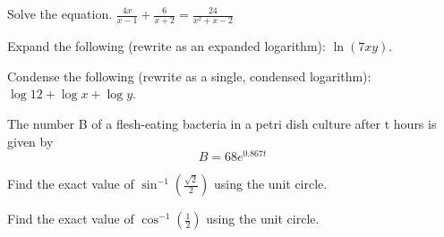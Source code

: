 \documentclass[../main.tex]{subfiles}
\begin{document}
\begin{questions}
    \newpage
    \question[1] Solve the equation. $\frac{4x}{x - 1} + \frac{6}{x + 2} = \frac{24}{x^2 + x - 2}$
    
    \question[1] Expand the following (rewrite as an expanded logarithm): $\ln(7xy)$. 
    
    \question[1] Condense the following (rewrite as a single, condensed logarithm): $\log 12 + \log x + \log y$. 
    
    \question[1] The number B of a flesh-eating bacteria in a petri dish culture after t hours is given by $$B = 68e^{0.867t}$$
     
    \question[1] Find the exact value of $\sin^{-1} (\frac{\sqrt{2}}{2})$ using the unit circle. 
    
    \question[1] Find the exact value of $\cos^{-1} (\frac{1}{2})$ using the unit circle. 
    

\end{questions}
\end{document}
